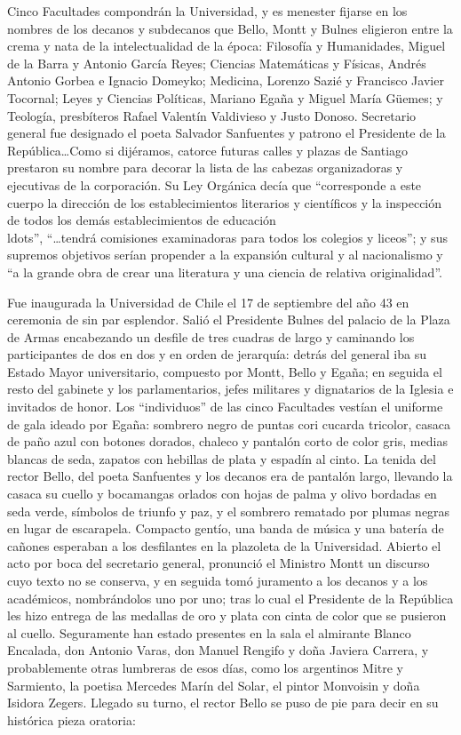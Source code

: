 \documentclass[10pt,twoside,openright]{memoir}
\begin{document}
Cinco Facultades compondrán la Universidad, y es menester fijarse en los
nombres de los decanos y subdecanos que Bello, Montt y Bulnes eligieron
entre la crema y nata de la intelectualidad de la época: Filosofía y
Humanidades, Miguel de la Barra y Antonio García Reyes; Ciencias
Matemáticas y Físicas, Andrés Antonio Gorbea e Ignacio Domeyko;
Medicina, Lorenzo Sazié y Francisco Javier Tocornal; Leyes y Ciencias
Políticas, Mariano Egaña y Miguel María Güemes; y Teología, presbíteros
Rafael Valentín Valdivieso y Justo Donoso. Secretario general fue
designado el poeta Salvador Sanfuentes y patrono el Presidente de la
República\ldots Como si dijéramos, catorce futuras calles y plazas de
Santiago prestaron su nombre para decorar la lista de las cabezas
organizadoras y ejecutivas de la corporación. Su Ley Orgánica decía que
``corresponde a este cuerpo la dirección de los establecimientos
literarios y científicos y la inspección de todos los demás
establecimientos de educación\\ldots'', ``\ldots{}tendrá comisiones
examinadoras para todos los colegios y liceos''; y sus supremos
objetivos serían propender a la expansión cultural y al nacionalismo y
``a la grande obra de crear una literatura y una ciencia de relativa
originalidad''.

Fue inaugurada la Universidad de Chile el 17 de septiembre del año 43 en
ceremonia de sin par esplendor. Salió el Presidente Bulnes del palacio
de la Plaza de Armas encabezando un desfile de tres cuadras de largo y
caminando los participantes de dos en dos y en orden de jerarquía:
detrás del general iba su Estado Mayor universitario, compuesto por
Montt, Bello y Egaña; en seguida el resto del gabinete y los
parlamentarios, jefes militares y dignatarios de la Iglesia e invitados
de honor. Los ``individuos'' de las cinco Facultades vestían el uniforme
de gala ideado por Egaña: sombrero negro de puntas cori cucarda
tricolor, casaca de paño azul con botones dorados, chaleco y pantalón
corto de color gris, medias blancas de seda, zapatos con hebillas de
plata y espadín al cinto. La tenida del rector Bello, del poeta
Sanfuentes y los decanos era de pantalón largo, llevando la casaca su
cuello y bocamangas orlados con hojas de palma y olivo bordadas en seda
verde, símbolos de triunfo y paz, y el sombrero rematado por plumas
negras en lugar de escarapela. Compacto gentío, una banda de música y
una batería de cañones esperaban a los desfilantes en la plazoleta de la
Universidad. Abierto el acto por boca del secretario general, pronunció
el Ministro Montt un discurso cuyo texto no se conserva, y en seguida
tomó juramento a los decanos y a los académicos, nombrándolos uno por
uno; tras lo cual el Presidente de la República les hizo entrega de las
medallas de oro y plata con cinta de color que se pusieron al cuello.
Seguramente han estado presentes en la sala el almirante Blanco
Encalada, don Antonio Varas, don Manuel Rengifo y doña Javiera Carrera,
y probablemente otras lumbreras de esos días, como los argentinos Mitre
y Sarmiento, la poetisa Mercedes Marín del Solar, el pintor Monvoisin y
doña Isidora Zegers. Llegado su turno, el rector Bello se puso de pie
para decir en su histórica pieza oratoria:
\end{document}
